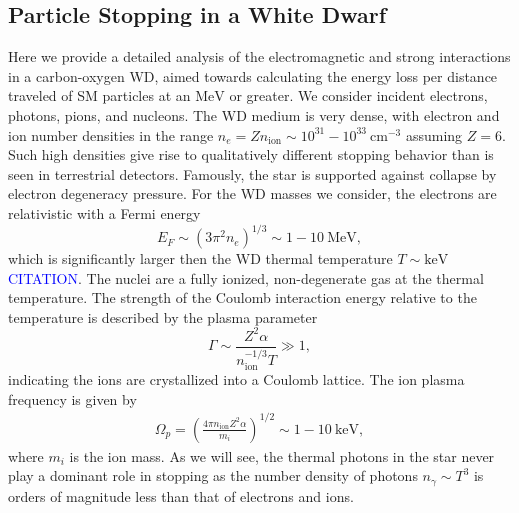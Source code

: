 \documentclass[twocolumn,preprintnumbers,amsmath,amssymb,prd, superscriptaddress]{revtex4} %
\newcommand{\MeV}{\text{MeV}}
\newcommand{\keV}{\text{keV}}
\newcommand{\cm}{\text{cm}}
\def\r{\right)}
\def\l{\left(}
\begin{document}
\begin{appendices}

\section{Particle Stopping in a White Dwarf}
\label{sec:Appendix}
Here we provide a detailed analysis of the electromagnetic and strong interactions in a carbon-oxygen WD, aimed towards calculating the energy loss per distance traveled of SM particles at an $\text{MeV}$ or greater.
We consider incident electrons, photons, pions, and nucleons.
The WD medium is very dense, with electron and ion number densities in the range $n_e = Z n_\text{ion} \sim 10^{31} - 10^{33} ~\cm^{-3}$ assuming $Z=6$.
Such high densities give rise to qualitatively different stopping behavior than is seen in terrestrial detectors.
Famously, the star is supported against collapse by electron degeneracy pressure.
For the WD masses we consider, the electrons are relativistic with a Fermi energy
\begin{equation}
  E_F \sim (3 \pi^2 n_e)^{1/3} \sim 1 -10 ~\MeV,
\end{equation}
which is significantly larger then the WD thermal temperature $T \sim \keV$ \textcolor{blue}{CITATION}.
The nuclei are a fully ionized, non-degenerate gas at the thermal temperature.
The strength of the Coulomb interaction energy relative to the temperature is described by the plasma parameter
\begin{equation}
\label{eq:lattice}
 \Gamma \sim \frac{Z^2 \alpha}{n_\text{ion}^{-1/3}T} \gg 1,
\end{equation}
indicating the ions are crystallized into a Coulomb lattice.
The ion plasma frequency is given by
\begin{align}
\Omega_p = \l \frac{4 \pi n_\text{ion} Z^2 \alpha}{m_i}\r^{1/2} \sim 1 - 10~\text{keV},
\end{align}
where $m_i$ is the ion mass.
As we will see, the thermal photons in the star never play a dominant role in stopping as the number density of photons $n_\gamma \sim T^3$ is orders of magnitude less than that of electrons and ions.




\end{appendices}
\end{document}
